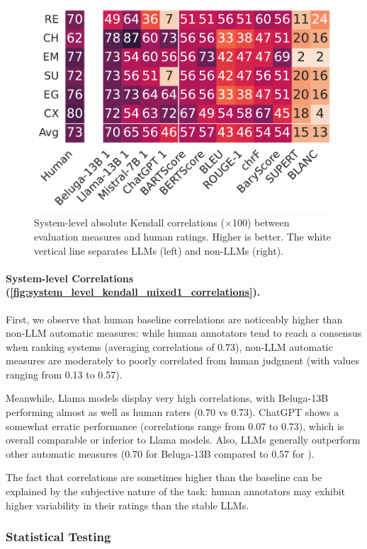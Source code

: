 \begin{figure}[!h]
    \centering
    \includegraphics[width=0.8\columnwidth]{pictures/llm_mixed1_w_system_kendall.pdf}
    \caption{System-level absolute Kendall correlations ($\times$100) between evaluation measures and human ratings. Higher is better. The white vertical line separates LLMs (left) and non-LLMs (right).}
    \label{fig:system_level_kendall_mixed1_correlations}
\end{figure}

\paragraph{System-level Correlations (\autoref{fig:system_level_kendall_mixed1_correlations}).}
First, we observe that human baseline correlations are noticeably higher than non-LLM automatic measures: while human annotators tend to reach a consensus when ranking systems (averaging correlations of 0.73), non-LLM automatic measures are moderately to poorly correlated from human judgment (with values ranging from 0.13 to 0.57).

Meanwhile, Llama models display very high correlations, with Beluga-13B performing almost as well as human raters (0.70 vs 0.73). ChatGPT shows a somewhat erratic performance (correlations range from 0.07 to 0.73), which is overall comparable or inferior to Llama models. Also, LLMs generally outperform other automatic measures (0.70 for Beluga-13B compared to 0.57 for {\bartscore}).

The fact that correlations are sometimes higher than the baseline can be explained by the subjective nature of the task: human annotators may exhibit higher variability in their ratings than the stable LLMs.

\subsubsection{Statistical Testing}

